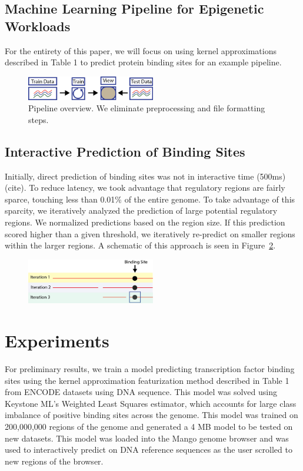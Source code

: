 \documentclass{sig-alternate-05-2015}
\begin{document}
\subsection{Machine Learning Pipeline for Epigenetic Workloads}
For the entirety of this paper, we will focus on using kernel approximations described in Table 1 to predict protein binding sites for an example pipeline.

\begin{figure}
  \label{fig:pipeline}
  \includegraphics[width=0.5\textwidth]{figures/ourpipeline.png}
  \caption{Pipeline overview. We eliminate preprocessing and file formatting steps.}
\end{figure}


\subsection{Interactive Prediction of Binding Sites}
Initially, direct prediction of binding sites was not in interactive time (500ms) (cite). To reduce latency, we took advantage that regulatory regions are fairly sparce, touching less than 0.01\% of the entire genome. To take advantage of this sparcity, we iteratively analyzed the prediction of large potential regulatory regions. We normalized predictions based on the region size. If this prediction scored higher than a given threshold, we iteratively re-predict on smaller regions within the larger regions. A schematic of this approach is seen in Figure~\ref{fig:iterations}.

\begin{figure}
  \label{fig:iterations}
  \includegraphics[width=0.5\textwidth]{figures/iterations.png}
  \caption{}
\end{figure}

\section{Experiments}

For preliminary results, we train a model predicting transcription factor binding sites using the kernel approximation featurization method described in Table 1 from ENCODE datasets using DNA sequence. This model was solved using Keystone ML’s Weighted Least Squares estimator, which accounts for large class imbalance of positive binding sites across the genome. This model was trained on 200,000,000 regions of the genome and generated a 4 MB model to be tested on new datasets. This model was loaded into the Mango genome browser and was used to interactively predict on DNA reference sequences as the user scrolled to new regions of the browser.
\end{document}
